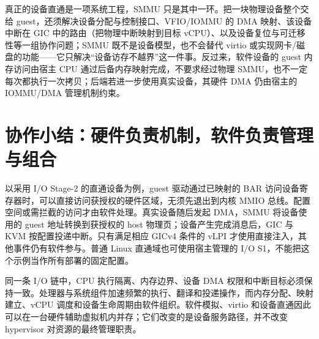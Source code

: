 真正的设备直通是一项系统工程，SMMU 只是其中一环。把一块物理设备整个交给 guest，还须解决设备分配与控制接口、VFIO/IOMMU 的 DMA 映射、该设备中断在 GIC 中的路由（把物理中断映射到目标 vCPU）、以及设备复位与可迁移性等一组协作问题；SMMU 既不是设备模型，也不会替代 virtio 或实现网卡/磁盘的功能——它只解决“设备访存不越界”这一件事。反过来，软件设备的 guest 内存访问由宿主 CPU 通过后备内存映射完成，不要求经过物理 SMMU，也不一定每次都执行一次拷贝；后端若进一步使用真实设备，其硬件 DMA 仍由宿主的 IOMMU/DMA 管理机制约束\cite{source5,source10}。

\section{协作小结：硬件负责机制，软件负责管理与组合}\label{sec:hardware-sum}

以采用 I/O Stage-2 的直通设备为例，guest 驱动通过已映射的 BAR 访问设备寄存器时，可以直接访问获授权的硬件区域，无须先退出到内核 MMIO 总线。配置空间或需拦截的访问才由软件处理。真实设备随后发起 DMA，SMMU 将设备使用的 guest 地址转换到获授权的 host 物理页；设备产生完成消息后，GIC 与 KVM 按配置投递中断。只有满足相应 GICv4 条件的 vLPI 才使用直接注入，其他事件仍有软件参与。普通 Linux 直通域也可使用宿主管理的 I/O S1，不能把这个示例当作所有部署的固定配置\cite{source5,source9,source10}。

同一条 I/O 链中，CPU 执行隔离、内存边界、设备 DMA 权限和中断目标必须保持一致。处理器与系统组件加速频繁的执行、翻译和投递操作，而内存分配、映射建立、vCPU 调度和设备生命周期由软件组织。软件模拟、virtio 和设备直通因此可以在一台硬件辅助虚拟机内并存；它们改变的是设备服务路径，并不改变 hypervisor 对资源的最终管理职责。
